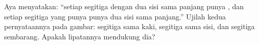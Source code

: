 \begin{exercise}[$\star\star$]\label{exo:g4:symmetry:11}
Aya menyatakan: ``setiap segitiga dengan dua sisi sama panjang punya
, dan setiap segitiga yang punya  punya
dua sisi sama panjang.'' Ujilah kedua pernyataannya pada gambar:
segitiga sama kaki, segitiga sama sisi, dan segitiga sembarang.
Apakah lipatannya mendukung dia?

\end{exercise}

